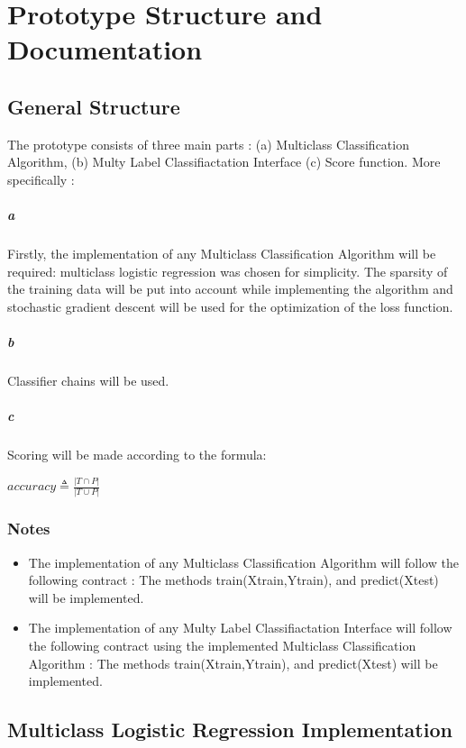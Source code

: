 \documentclass[10pt,letterpaper]{article}
\begin{document}
	\newpage
	
	
	\section*{Prototype Structure and Documentation}
	\subsection*{General Structure}
	The prototype consists of three main parts : (a) Multiclass Classification Algorithm, (b) Multy Label Classifiactation Interface (c) Score function.  More specifically :

	\subparagraph{a}Firstly, the implementation of any Multiclass Classification Algorithm will be required: multiclass logistic regression was chosen for simplicity. 
	The sparsity of the training data will be put into account while implementing the algorithm and stochastic gradient descent will be used for the optimization of the loss function.
	
	\subparagraph{b}Classifier chains \cite{MLC_finland} will be used.
	
	\subparagraph{c}Scoring will be made according to the formula:
	\begin{center}
		$accuracy \triangleq \frac{|T \cap P|}{|T \cup P |}$
	\end{center}
	
	\subsubsection*{Notes}
	\begin{itemize}
		\item The implementation of any Multiclass Classification Algorithm will follow the following contract : The methods train(Xtrain,Ytrain), and predict(Xtest) will be implemented.
		\item The implementation of any Multy Label Classifiactation Interface will follow the following contract using the implemented Multiclass Classification Algorithm  : The methods train(Xtrain,Ytrain), and predict(Xtest) will be implemented.

	\end{itemize}
	
	\subsection*{Multiclass Logistic Regression Implementation}
	
\end{document}
